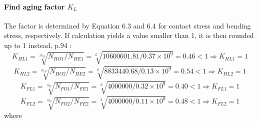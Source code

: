 \paragraph{Find aging factor $ K_L $}
The factor is determined by Equation 6.3 and 6.4 \cite{tk1} for contact stress and bending stress, respectively. If calculation yields a value smaller than 1, it is then rounded up to 1 instead, p.94 \cite{tk1}:\\
\[ K_{HL1} = \sqrt[m_H]{N_{HO1}/N_{HE1}} = \sqrt[6]{10600601.81/0.37 \times10^9} = 0.46 < 1 \Rightarrow K_{HL1} = 1\]
\[ K_{HL2} = \sqrt[m_H]{N_{HO2}/N_{HE2}} = \sqrt[6]{8833440.68/0.13 \times10^9} = 0.54 < 1 \Rightarrow K_{HL2} = 1\]
\[ K_{FL1} = \sqrt[m_F]{N_{FO1}/N_{FE1}} = \sqrt[6]{4000000/0.32 \times10^9} = 0.40 < 1 \Rightarrow K_{FL1} = 1\]
\[ K_{FL2} = \sqrt[m_F]{N_{FO2}/N_{FE2}} = \sqrt[6]{4000000/0.11 \times10^9} = 0.48 < 1 \Rightarrow K_{FL2} = 1\]
where
